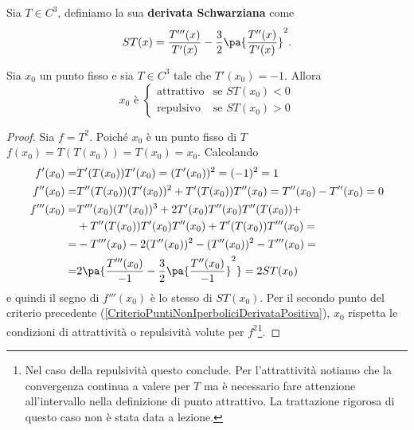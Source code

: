 \begin{definition}
Sia $T\in C^3$, definiamo la sua \textbf{derivata Schwarziana} come
\[ST(x)=\frac{T'''(x)}{T'(x)}-\frac32\pa{\frac{T''(x)}{T'(x)}}^2.\]
\end{definition}
\begin{proposition}\label{CriterioPuntiNonIperboliciDerivataNegativa}
Sia $x_0$ un punto fisso e sia $T\in C^3$ tale che $T'(x_0)=-1$. Allora
\[x_0\text{ \`e }\begin{cases}
\text{attrattivo} &\text{se }ST(x_0)<0\\
\text{repulsivo} &\text{se }ST(x_0)>0
\end{cases}\]
\end{proposition}
\begin{proof}
Sia $f=T^2$. Poich\'e $x_0$ \`e un punto fisso di $T$ $f(x_0)=T(T(x_0))=T(x_0)=x_0$. Calcolando
\begin{align*}
	f'(x_0)=&T'(T(x_0))T'(x_0)=(T'(x_0))^2=(-1)^2=1\\
	f''(x_0)=&T''(T(x_0))(T'(x_0))^2+T'(T(x_0))T''(x_0)=T''(x_0)-T''(x_0)=0\\
	f'''(x_0)=&T'''(x_0)(T'(x_0))^3+2T'(x_0)T''(x_0)T''(T(x_0))+\\
	&+T''(T(x_0))T'(x_0)T''(x_0)+T'(T(x_0))T'''(x_0)=\\
	=&-T'''(x_0)-2(T''(x_0))^2-(T''(x_0))^2-T'''(x_0)=\\
	=&2\pa{\frac{T'''(x_0)}{-1}-\frac32\pa{\frac{T''(x_0)}{-1}}^2}=2ST(x_0)
\end{align*}
e quindi il segno di $f'''(x_0)$ \`e lo stesso di $ST(x_0)$. Per il secondo punto del criterio precedente (\ref{CriterioPuntiNonIperboliciDerivataPositiva}), $x_0$ rispetta le condizioni di attrattivit\`a o repulsivit\`a volute per $f^2$\footnote{Nel caso della repulsivit\`a questo conclude. Per l'attrattivit\`a notiamo che la convergenza continua a valere per $T$ ma \`e necessario fare attenzione all'intervallo nella definizione di punto attrattivo. La trattazione rigorosa di questo caso non \`e stata data a lezione.}.
\end{proof}

